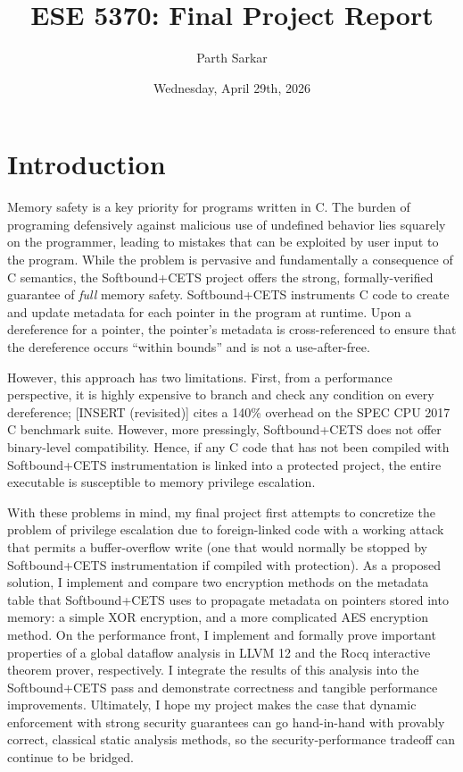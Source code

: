 \documentclass{article}
\title{ESE 5370: Final Project Report}
\author{Parth Sarkar}
\date{Wednesday, April 29th, 2026}
\begin{document}
\maketitle

\section{Introduction}

    Memory safety is a key priority for programs written in C. The burden
    of programing defensively against malicious use of undefined behavior lies
    squarely on the programmer, leading to mistakes that can be exploited by
    user input to the program. While the problem is pervasive and fundamentally
    a consequence of C semantics, the Softbound+CETS project offers the strong,
    formally-verified guarantee of \textit{full} memory safety. Softbound+CETS 
    instruments C code to create and update metadata for each pointer in the
    program at runtime. Upon a dereference for a pointer, the pointer's metadata
    is cross-referenced to ensure that the dereference occurs ``within bounds''
    and is not a use-after-free. 
    
    \bigbreak{}
    
    However, this approach has two limitations. First, from a performance
    perspective, it is highly expensive to branch and check any condition on 
    every dereference; [INSERT (revisited)] cites a 140\% overhead on the
    SPEC CPU 2017 C benchmark suite. However, more pressingly, Softbound+CETS
    does not offer binary-level compatibility. Hence, if any C code that has
    not been compiled with Softbound+CETS instrumentation is linked into a
    protected project, the entire executable is susceptible to memory privilege
    escalation.

    \bigbreak{}

    With these problems in mind, my final project first attempts to concretize
    the problem of privilege escalation due to foreign-linked code with a 
    working attack that permits a buffer-overflow write (one that would normally 
    be stopped by Softbound+CETS instrumentation if compiled with protection).
    As a proposed solution, I implement and compare two encryption methods on 
    the metadata table that Softbound+CETS uses to propagate metadata on 
    pointers stored into memory: a simple XOR encryption, and a more complicated 
    AES encryption method. On the performance front, I implement and formally
    prove important properties of a global dataflow analysis in LLVM 12 and the
    Rocq interactive theorem prover, respectively. I integrate the results of 
    this analysis into the Softbound+CETS pass and demonstrate correctness
    and tangible performance improvements. Ultimately, I hope my project makes 
    the case that dynamic enforcement with strong security guarantees can go
    hand-in-hand with provably correct, classical static analysis methods,
    so the security-performance tradeoff can continue to be bridged.
\end{document}
